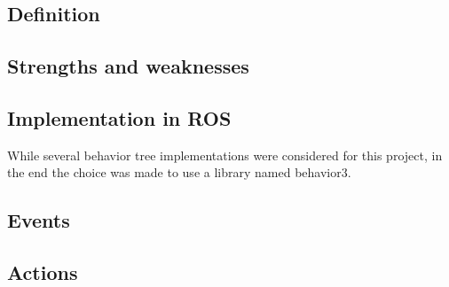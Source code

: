 \documentclass[\rootfolder/main.tex]{subfiles}
\begin{document}
\subsection{Definition}

\subsection{Strengths and weaknesses}

\subsection{Implementation in ROS}

While several behavior tree implementations were considered for this project, in the end the choice was made to use a library named behavior3.

\subsection{Events}

\subsection{Actions}






\end{document}
